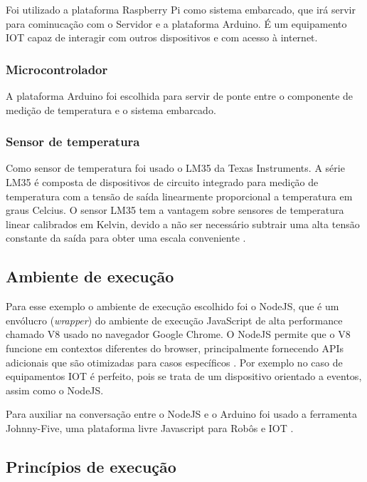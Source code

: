 Foi utilizado a plataforma Raspberry Pi como sistema embarcado, que irá
servir para cominucação com o Servidor e a plataforma Arduino. É um
equipamento IOT capaz de interagir com outros dispositivos e com acesso
à internet.

\subsubsection{Microcontrolador}\label{microcontrolador}

A plataforma Arduino foi escolhida para servir de ponte entre o
componente de medição de temperatura e o sistema embarcado.

\subsubsection{Sensor de temperatura}\label{sensor-de-temperatura}

Como sensor de temperatura foi usado o LM35 da Texas Instruments. A
série LM35 é composta de dispositivos de circuito integrado para medição
de temperatura com a tensão de saída linearmente proporcional a
temperatura em graus Celcius. O sensor LM35 tem a vantagem sobre
sensores de temperatura linear calibrados em Kelvin, devido a não ser
necessário subtrair uma alta tensão constante da saída para obter uma
escala conveniente \cite{lm35:2016}.

\subsection{Ambiente de execução}\label{ambiente-de-execuuxe7uxe3o}

Para esse exemplo o ambiente de execução escolhido foi o NodeJS, que é
um envólucro (\emph{wrapper}) do ambiente de execução JavaScript de alta
performance chamado V8 usado no navegador Google Chrome. O NodeJS
permite que o V8 funcione em contextos diferentes do browser,
principalmente fornecendo APIs adicionais que são otimizadas para casos
específicos \cite{hughes-croucher:2012}. Por exemplo no caso de
equipamentos IOT é perfeito, pois se trata de um dispositivo orientado a
eventos, assim como o NodeJS.

Para auxiliar na conversação entre o NodeJS e o Arduino foi usado a
ferramenta Johnny-Five, uma plataforma livre Javascript para Robôs e IOT
\cite{johnny-five:2012}.

\subsection{Princípios de
execução}\label{princuxedpios-de-execuuxe7uxe3o}

